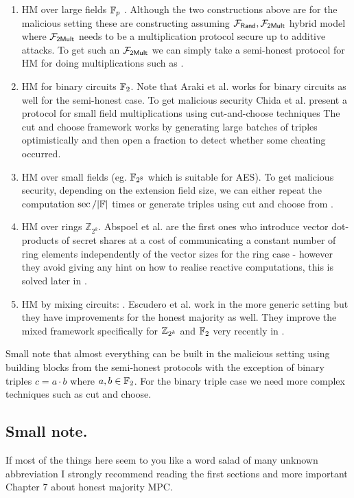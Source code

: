 \documentclass[11pt]{article}
\begin{document}
\begin{enumerate}
  \item HM over large fields $\mathbb{F}_p$ \cite{CCS:LinNof17,C:CGHIKL18}. Although the
  two constructions above are for the malicious setting these are constructing
  assuming $\mathcal{F}_\mathsf{Rand}, \mathcal{F}_\mathsf{2Mult}$ hybrid model where $\mathcal{F}_\mathsf{2Mult}$ needs to be a multiplication
  protocol secure up to additive attacks. To get such an $\mathcal{F}_\mathsf{2Mult}$ we can simply take
  a semi-honest protocol for HM for doing multiplications such as \cite{CCS:AFLNO16}.
  \item HM for binary circuits $\mathbb{F}_2$. Note that Araki et al. \cite{CCS:AFLNO16}
  works for binary circuits as well for the semi-honest case.
  To get malicious security Chida et al. \cite{C:CGHIKL18} present a protocol
  for small field multiplications using cut-and-choose techniques The cut and
  choose framework works by generating large batches of triples
  optimistically and then open a fraction to detect whether some cheating
  occurred.
  \item HM over small fields (eg. $\mathbb{F}_{2^8}$ which is suitable for AES). To
  get malicious security, depending on the extension field size, we can
  either repeat the computation $\sec/|\mathbb{F}|$ times or generate triples using cut and choose
  from \cite{C:CGHIKL18}.
  \item HM over rings $\mathbb{Z}_{2^k}$. Abspoel et al. \cite{EPRINT:ADEN19}
  are the first ones who introduce vector dot-products of secret shares at a cost of
  communicating a constant number of ring elements independently of the vector sizes
  for the ring case - however they avoid giving any hint on how to realise
  reactive computations, this is solved later in \cite{cryptoeprint:2020:1330}.
  \item HM by mixing circuits: \cite{CCS:MohRin18,cryptoeprint:2020:1330}.
  Escudero et al. \cite{C:EGKRS20} work in the more generic setting but they
  have
  improvements for the honest majority as well. They improve the mixed framework
  specifically for $\mathbb{Z}_{2^k}$ and $\mathbb{F}_2$ very recently in \cite{cryptoeprint:2020:1330}.

\end{enumerate}

Small note that almost everything can be built in the malicious setting using
building blocks from the semi-honest protocols with the exception of binary triples
$c = a \cdot b$ where $a,b \in \mathbb{F}_2$. For the binary triple case we need more
complex techniques such as cut and choose.


\subsection{Small note.}
If most of the things here seem to you like a word salad of many unknown
abbreviation I strongly recommend reading the first sections
\cite{evans2017pragmatic} and more important Chapter 7 about honest majority MPC.
\end{document}
